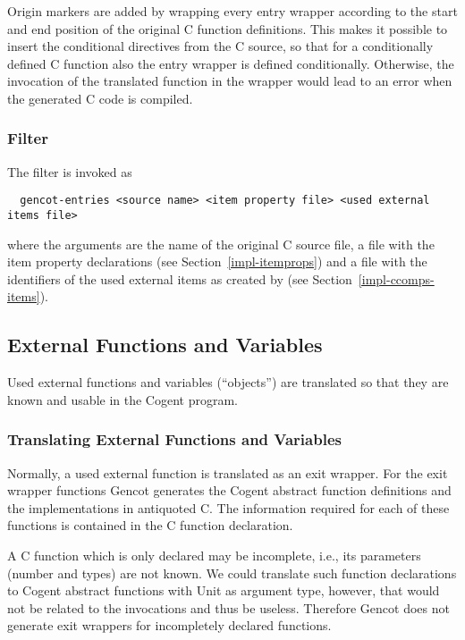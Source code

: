 Origin markers are added by wrapping every entry wrapper according to the start and end position of the 
original C function definitions. This makes it possible to insert the conditional directives from the C source,
so that for a conditionally defined C function also the entry wrapper is defined conditionally. Otherwise,
the invocation of the translated function in the wrapper would lead to an error when the generated C code
is compiled.

\subsubsection{Filter }

The filter  is invoked as
\begin{verbatim}
  gencot-entries <source name> <item property file> <used external items file>
\end{verbatim}
where the arguments are the name of the original C source file, a file with the item property declarations (see 
Section~\ref{impl-itemprops}) and a file with the identifiers of the used external items as created 
by  (see Section~\ref{impl-ccomps-items}).

\subsection{External Functions and Variables}
\label{impl-ccomps-externs}

Used external functions and variables (``objects'') are translated so that they are known and usable
in the Cogent program.

\subsubsection{Translating External Functions and Variables}

Normally, a used external function is translated as an exit wrapper.
For the exit wrapper functions Gencot generates the Cogent abstract function definitions and the implementations
in antiquoted C. 
The information required for each of these functions is contained in the C function declaration.

A C function which is only declared may be incomplete, i.e., its parameters (number and types) are not known. 
We could translate such function declarations to Cogent abstract functions with Unit as argument type, however,
that would not be related to the invocations and thus be useless. Therefore Gencot does not generate exit 
wrappers for incompletely declared functions.

